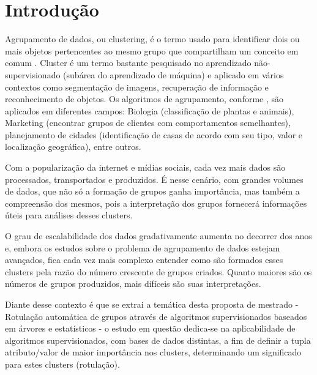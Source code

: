 

\chapter{Introdução} \label{cap:introd}

Agrupamento de dados, ou clustering, é o termo usado para identificar dois ou mais objetos pertencentes ao mesmo grupo que compartilham um conceito em comum \cite{Kumar2013}. Cluster é um termo bastante pesquisado no aprendizado não-supervisionado (subárea do aprendizado de máquina) e aplicado em vários contextos como segmentação de imagens, recuperação de informação e reconhecimento de objetos. Os algoritmos de agrupamento, conforme , são aplicados em diferentes campos: Biologia (classificação de plantas e animais), Marketing (encontrar grupos de clientes com comportamentos semelhantes), planejamento de cidades (identificação de casas de acordo com seu tipo, valor e localização geográfica), entre outros.

Com a popularização da internet e mídias sociais, cada vez mais dados são processados, transportados e produzidos. É nesse cenário, com grandes volumes de dados, que não só a formação de grupos ganha importância, mas também a compreensão dos mesmos, pois a interpretação dos grupos fornecerá informações úteis para análises desses clusters.


O grau de escalabilidade dos dados gradativamente aumenta no decorrer dos anos e, embora os estudos sobre o problema de agrupamento de dados estejam avançados, fica cada vez mais complexo entender como são formados esses clusters pela razão do número crescente de grupos criados. Quanto maiores são os números de grupos produzidos, mais difíceis são suas interpretações. 

Diante desse contexto é que se extrai a temática desta proposta de mestrado - Rotulação automática de grupos através de algoritmos supervisionados baseados em árvores e estatísticos - o estudo em questão dedica-se na aplicabilidade de algoritmos supervisionados, com bases de dados distintas, a fim de definir a tupla atributo/valor de maior importância nos clusters, determinando um significado para estes clusters (rotulação).

